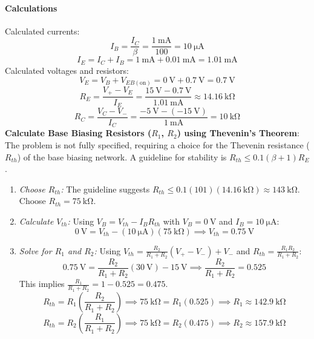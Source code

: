 \documentclass[12pt]{article}
\begin{document}
\paragraph{Calculations}
Calculated currents:
$$
I_B = \frac{I_C}{\beta} = \frac{\SI{1}{\milli\ampere}}{100} = \SI{10}{\micro\ampere}
$$
$$
I_E = I_C + I_B = \SI{1}{\milli\ampere} + \SI{0.01}{\milli\ampere} = \SI{1.01}{\milli\ampere}
$$
Calculated voltages and resistors:
$$
V_E = V_B + V_{EB(\text{on})} = \SI{0}{\volt} + \SI{0.7}{\volt} = \SI{0.7}{\volt}
$$
$$
R_E = \frac{V_{+} - V_E}{I_E} = \frac{\SI{15}{\volt} - \SI{0.7}{\volt}}{\SI{1.01}{\milli\ampere}} \approx \SI{14.16}{\kilo\ohm}
$$
$$
R_C = \frac{V_C - V_{-}}{I_C} = \frac{\SI{-5}{\volt} - (\SI{-15}{\volt})}{\SI{1}{\milli\ampere}} = \SI{10}{\kilo\ohm}
$$
\textbf{Calculate Base Biasing Resistors ($R_1$, $R_2$) using Thevenin's Theorem}:\\
The problem is not fully specified, requiring a choice for the Thevenin resistance ($R_{th}$) of the base biasing network. A guideline for stability is $R_{th} \le 0.1(\beta+1)R_E$.
\begin{enumerate}
    \item \textit{Choose $R_{th}$:} The guideline suggests $R_{th} \le 0.1(101)(\SI{14.16}{\kilo\ohm}) \approx \SI{143}{\kilo\ohm}$. Choose $R_{th} = \SI{75}{\kilo\ohm}$.
    \item \textit{Calculate $V_{th}$:} Using $V_B = V_{th} - I_B R_{th}$ with $V_B = \SI{0}{\volt}$ and $I_B = \SI{10}{\micro\ampere}$:
    $$
    \SI{0}{\volt} = V_{th} - (\SI{10}{\micro\ampere})(\SI{75}{\kilo\ohm}) \implies V_{th} = \SI{0.75}{\volt}
    $$
    \item \textit{Solve for $R_1$ and $R_2$:} Using $V_{th} = \frac{R_2}{R_1+R_2}(V_+ - V_-) + V_-$ and $R_{th} = \frac{R_1 R_2}{R_1 + R_2}$:
    $$ \SI{0.75}{\volt} = \frac{R_2}{R_1+R_2}(\SI{30}{\volt}) - \SI{15}{\volt} \implies \frac{R_2}{R_1+R_2} = 0.525 $$
    This implies $\frac{R_1}{R_1+R_2} = 1 - 0.525 = 0.475$.
    $$ R_{th} = R_1 \left(\frac{R_2}{R_1+R_2}\right) \implies \SI{75}{\kilo\ohm} = R_1 (0.525) \implies R_1 \approx \SI{142.9}{\kilo\ohm} $$
    $$ R_{th} = R_2 \left(\frac{R_1}{R_1+R_2}\right) \implies \SI{75}{\kilo\ohm} = R_2 (0.475) \implies R_2 \approx \SI{157.9}{\kilo\ohm} $$
\end{enumerate}
\end{document}

